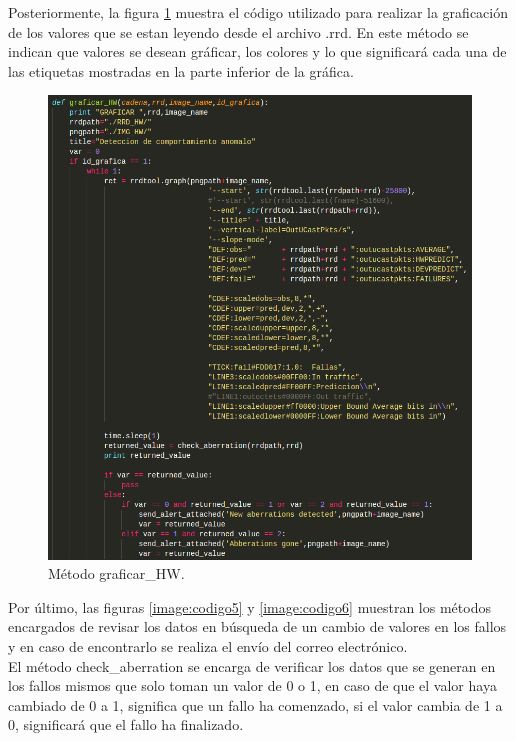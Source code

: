 Posteriormente, la figura \ref{image:codigo2} muestra el código utilizado para realizar la graficación de los valores que se estan leyendo desde el archivo .rrd. En este método se indican que valores se desean gráficar, los colores y lo que significará cada una de las etiquetas mostradas en la parte inferior de la gráfica.
\FloatBarrier
\begin{figure}[htbp!]
		\centering
			\includegraphics[width=1 \textwidth]{images/codigo2}
		\caption{Método graficar\_HW.}
		\label{image:codigo2}
\end{figure}
\FloatBarrier
Por último, las figuras \ref{image:codigo5} y \ref{image:codigo6} muestran los métodos encargados de revisar los datos en búsqueda de un cambio de valores en los fallos y en caso de encontrarlo se realiza el envío del correo electrónico.\\
El método check\_aberration se encarga de verificar los datos que se generan en los fallos mismos que solo toman un valor de 0 o 1, en caso de que el valor haya cambiado de 0 a 1, significa que un fallo ha comenzado, si el valor cambia de 1 a 0, significará que el fallo ha finalizado.
\FloatBarrier
